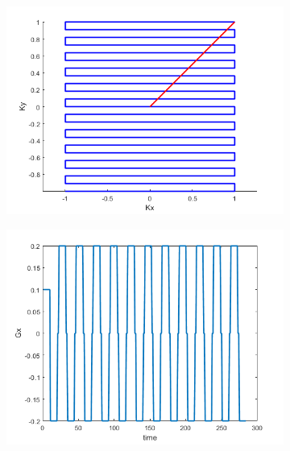 \documentclass[12pt]{article}
\begin{document}
\begin{figure}[H]
\begin{subfigure}{0.3\textwidth}
	
	\includegraphics[width=\textwidth]{Figures/StepK.png}
	\caption{}
	\label{Fig:stepK}
\end{subfigure}
\begin{subfigure}{0.3\textwidth}
	
	\includegraphics[width=\textwidth]{Figures/StepGx.png}
	\caption{}
	\label{Fig:stepGx}
\end{subfigure}
\begin{subfigure}{0.3\textwidth}
	

\end{subfigure}
\end{figure}
\end{document}
